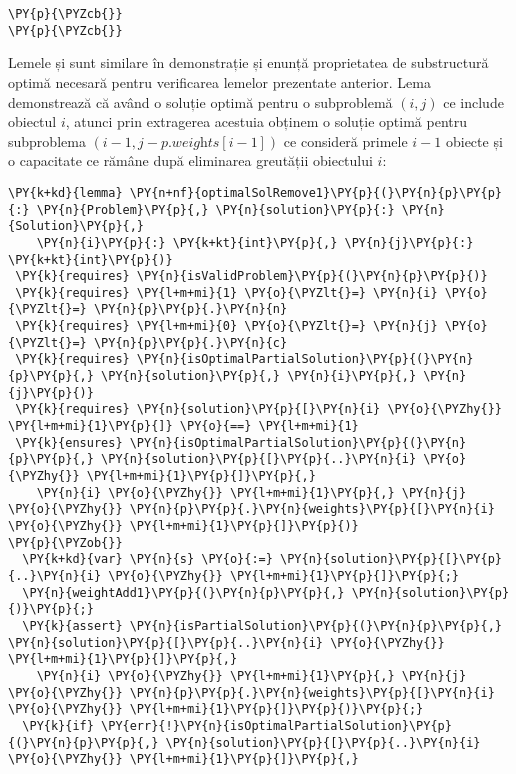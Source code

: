 \begin{sloppypar}
\begin{Verbatim}[commandchars=\\\{\}]
  \PY{p}{\PYZcb{}}
\PY{p}{\PYZcb{}}
\end{Verbatim}
\hspace{4mm} Lemele  și  sunt similare în demonstrație și enunță proprietatea de substructură optimă necesară pentru verificarea lemelor prezentate anterior. Lema  demonstrează că având o soluție optimă pentru o subproblemă $(i, j)$ ce include obiectul $i$, atunci prin extragerea acestuia obținem o soluție optimă pentru subproblema $(i - 1, j - \textit{p.weights}[i - 1])$ ce consideră primele $i - 1$ obiecte și o capacitate ce rămâne după eliminarea greutății obiectului $i$:
\begin{Verbatim}[commandchars=\\\{\}]
\PY{k+kd}{lemma} \PY{n+nf}{optimalSolRemove1}\PY{p}{(}\PY{n}{p}\PY{p}{:} \PY{n}{Problem}\PY{p}{,} \PY{n}{solution}\PY{p}{:} \PY{n}{Solution}\PY{p}{,} 
    \PY{n}{i}\PY{p}{:} \PY{k+kt}{int}\PY{p}{,} \PY{n}{j}\PY{p}{:} \PY{k+kt}{int}\PY{p}{)}
 \PY{k}{requires} \PY{n}{isValidProblem}\PY{p}{(}\PY{n}{p}\PY{p}{)}
 \PY{k}{requires} \PY{l+m+mi}{1} \PY{o}{\PYZlt{}=} \PY{n}{i} \PY{o}{\PYZlt{}=} \PY{n}{p}\PY{p}{.}\PY{n}{n}
 \PY{k}{requires} \PY{l+m+mi}{0} \PY{o}{\PYZlt{}=} \PY{n}{j} \PY{o}{\PYZlt{}=} \PY{n}{p}\PY{p}{.}\PY{n}{c}
 \PY{k}{requires} \PY{n}{isOptimalPartialSolution}\PY{p}{(}\PY{n}{p}\PY{p}{,} \PY{n}{solution}\PY{p}{,} \PY{n}{i}\PY{p}{,} \PY{n}{j}\PY{p}{)}
 \PY{k}{requires} \PY{n}{solution}\PY{p}{[}\PY{n}{i} \PY{o}{\PYZhy{}} \PY{l+m+mi}{1}\PY{p}{]} \PY{o}{==} \PY{l+m+mi}{1}
 \PY{k}{ensures} \PY{n}{isOptimalPartialSolution}\PY{p}{(}\PY{n}{p}\PY{p}{,} \PY{n}{solution}\PY{p}{[}\PY{p}{..}\PY{n}{i} \PY{o}{\PYZhy{}} \PY{l+m+mi}{1}\PY{p}{]}\PY{p}{,} 
    \PY{n}{i} \PY{o}{\PYZhy{}} \PY{l+m+mi}{1}\PY{p}{,} \PY{n}{j} \PY{o}{\PYZhy{}} \PY{n}{p}\PY{p}{.}\PY{n}{weights}\PY{p}{[}\PY{n}{i} \PY{o}{\PYZhy{}} \PY{l+m+mi}{1}\PY{p}{]}\PY{p}{)}
\PY{p}{\PYZob{}}
  \PY{k+kd}{var} \PY{n}{s} \PY{o}{:=} \PY{n}{solution}\PY{p}{[}\PY{p}{..}\PY{n}{i} \PY{o}{\PYZhy{}} \PY{l+m+mi}{1}\PY{p}{]}\PY{p}{;}
  \PY{n}{weightAdd1}\PY{p}{(}\PY{n}{p}\PY{p}{,} \PY{n}{solution}\PY{p}{)}\PY{p}{;}
  \PY{k}{assert} \PY{n}{isPartialSolution}\PY{p}{(}\PY{n}{p}\PY{p}{,} \PY{n}{solution}\PY{p}{[}\PY{p}{..}\PY{n}{i} \PY{o}{\PYZhy{}} \PY{l+m+mi}{1}\PY{p}{]}\PY{p}{,} 
    \PY{n}{i} \PY{o}{\PYZhy{}} \PY{l+m+mi}{1}\PY{p}{,} \PY{n}{j} \PY{o}{\PYZhy{}} \PY{n}{p}\PY{p}{.}\PY{n}{weights}\PY{p}{[}\PY{n}{i} \PY{o}{\PYZhy{}} \PY{l+m+mi}{1}\PY{p}{]}\PY{p}{)}\PY{p}{;}
  \PY{k}{if} \PY{err}{!}\PY{n}{isOptimalPartialSolution}\PY{p}{(}\PY{n}{p}\PY{p}{,} \PY{n}{solution}\PY{p}{[}\PY{p}{..}\PY{n}{i} \PY{o}{\PYZhy{}} \PY{l+m+mi}{1}\PY{p}{]}\PY{p}{,} 

\end{Verbatim}
\end{sloppypar}
